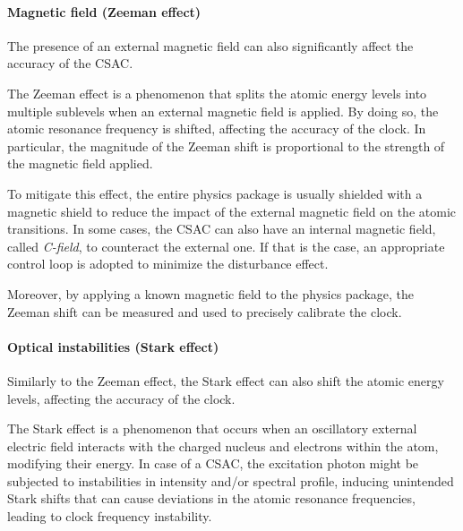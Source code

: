 \paragraph{Magnetic field (Zeeman effect)}

The presence of an external magnetic field can also significantly affect the accuracy of the CSAC.

The Zeeman effect is a phenomenon that splits the atomic energy levels into multiple sublevels when an external magnetic field is applied.
By doing so, the atomic resonance frequency is shifted, affecting the accuracy of the clock.
In particular, the magnitude of the Zeeman shift is proportional to the strength of the magnetic field applied.

To mitigate this effect, the entire physics package is usually shielded with a magnetic shield to reduce the impact of the external magnetic field on the atomic transitions.
In some cases, the CSAC can also have an internal magnetic field, called \textit{C-field}, to counteract the external one.
If that is the case, an appropriate control loop is adopted to minimize the disturbance effect.

Moreover, by applying a known magnetic field to the physics package, the Zeeman shift can be measured and used to precisely calibrate the clock.


\paragraph{Optical instabilities (Stark effect)}

Similarly to the Zeeman effect, the Stark effect can also shift the atomic energy levels, affecting the accuracy of the clock.

The Stark effect is a phenomenon that occurs when an oscillatory external electric field interacts with the charged nucleus and electrons within the atom, modifying their energy.
In case of a CSAC, the excitation photon might be subjected to instabilities in intensity and/or spectral profile, inducing unintended Stark shifts that can cause deviations in the atomic resonance frequencies, leading to clock frequency instability.



